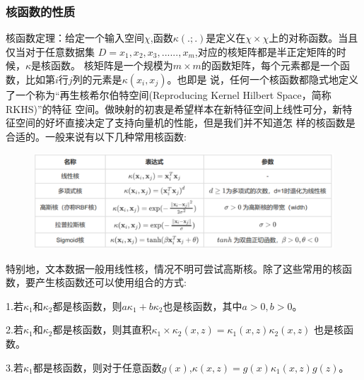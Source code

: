 \documentclass[UTF8]{ctexart}
\begin{document}
{\subsubsection{核函数的性质}
核函数定理：给定一个输入空间$\chi$,函数$\kappa(.;.)$是定义在$\chi\times\chi$上的对称函数。当且仅当对于任意数据集
$D={x_1,x_2,x_3,......,x_m}$,对应的核矩阵都是半正定矩阵的时候，$\kappa$是核函数。
核矩阵是一个规模为$m\times m$的函数矩阵，每个元素都是一个函数，比如第$i$行$j$列的元素是$\kappa(x_i,x_j)$。也即是
说，任何一个核函数都隐式地定义了一个称为“再生核希尔伯特空间(Reproducing Kernel Hilbert Space，简称RKHS)”的特征
空间。做映射的初衷是希望样本在新特征空间上线性可分，新特征空间的好坏直接决定了支持向量机的性能，但是我们并不知道怎
样的核函数是合适的。一般来说有以下几种常用核函数:\par
\begin{figure}[ht]
    \centering
    \includegraphics[scale=0.5]{04.PNG}
\end{figure}\par
特别地，文本数据一般用线性核，情况不明可尝试高斯核。除了这些常用的核函数，要产生核函数还可以使用组合的方式:\par
1.若$\kappa_1$和$\kappa_2$都是核函数，则$a\kappa_1+b\kappa_2$也是核函数，其中$a>0,b>0$。\par
2.若$\kappa_1$和$\kappa_2$都是核函数，则其直积$\kappa_1\times\kappa_2(x,z)=\kappa_1(x,z)\kappa_2(x,z)$
也是核函数。\par
3.若$\kappa_1$都是核函数，则对于任意函数$g(x)$,$\kappa(x,z)=g(x)\kappa_1(x,z)g(z)$。\newpage
}
\end{document}

